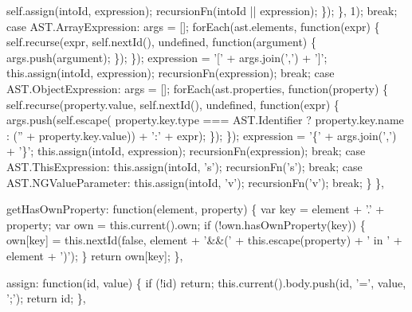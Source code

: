 \begin{DoxyCodeInclude}
{{{          self.assign(intoId, expression);
          recursionFn(intoId || expression);
        \});
      \}, 1);
      \textcolor{keywordflow}{break};
    \textcolor{keywordflow}{case} AST.ArrayExpression:
      args = [];
      forEach(ast.elements, \textcolor{keyword}{function}(expr) \{
        self.recurse(expr, self.nextId(), undefined, function(argument) \{
          args.push(argument);
        \});
      \});
      expression = \textcolor{charliteral}{'['} + args.join(\textcolor{charliteral}{','}) + \textcolor{charliteral}{']'};
      this.assign(intoId, expression);
      recursionFn(expression);
      \textcolor{keywordflow}{break};
    \textcolor{keywordflow}{case} AST.ObjectExpression:
      args = [];
      forEach(ast.properties, \textcolor{keyword}{function}(property) \{
        self.recurse(property.value, self.nextId(), undefined, function(expr) \{
          args.push(self.escape(
              property.key.type === AST.Identifier ? property.key.name :
                (\textcolor{stringliteral}{''} + property.key.value)) +
              \textcolor{stringliteral}{':'} + expr);
        \});
      \});
      expression = \textcolor{charliteral}{'\{'} + args.join(\textcolor{charliteral}{','}) + \textcolor{charliteral}{'\}'};
      this.assign(intoId, expression);
      recursionFn(expression);
      \textcolor{keywordflow}{break};
    \textcolor{keywordflow}{case} AST.ThisExpression:
      this.assign(intoId, \textcolor{charliteral}{'s'});
      recursionFn(\textcolor{charliteral}{'s'});
      \textcolor{keywordflow}{break};
    \textcolor{keywordflow}{case} AST.NGValueParameter:
      this.assign(intoId, \textcolor{charliteral}{'v'});
      recursionFn(\textcolor{charliteral}{'v'});
      \textcolor{keywordflow}{break};
    \}
  \},

  getHasOwnProperty: \textcolor{keyword}{function}(element, property) \{
    var key = element + \textcolor{charliteral}{'.'} + property;
    var own = this.current().own;
    \textcolor{keywordflow}{if} (!own.hasOwnProperty(key)) \{
      own[key] = this.nextId(\textcolor{keyword}{false}, element + \textcolor{stringliteral}{'&&('} + this.escape(property) + \textcolor{stringliteral}{' in '} + element + \textcolor{charliteral}{')'});
    \}
    \textcolor{keywordflow}{return} own[key];
  \},

  assign: \textcolor{keyword}{function}(id, value) \{
    \textcolor{keywordflow}{if} (!\textcolor{keywordtype}{id}) \textcolor{keywordflow}{return};
    this.current().body.push(\textcolor{keywordtype}{id}, \textcolor{charliteral}{'='}, value, \textcolor{charliteral}{';'});
    \textcolor{keywordflow}{return} id;
  \},

}}}
\end{DoxyCodeInclude}
